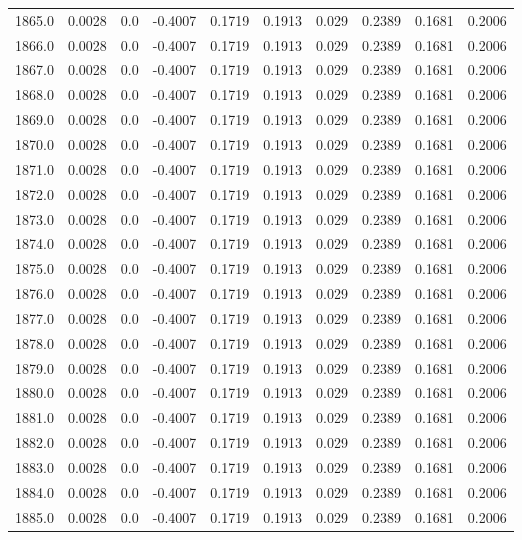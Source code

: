\begin{longtable}{lrrrrrrrrr}
1865.0 & 0.0028 & 0.0 & -0.4007 & 0.1719 & 0.1913 & 0.029 & 0.2389 & 0.1681 & 0.2006 \\
1866.0 & 0.0028 & 0.0 & -0.4007 & 0.1719 & 0.1913 & 0.029 & 0.2389 & 0.1681 & 0.2006 \\
1867.0 & 0.0028 & 0.0 & -0.4007 & 0.1719 & 0.1913 & 0.029 & 0.2389 & 0.1681 & 0.2006 \\
1868.0 & 0.0028 & 0.0 & -0.4007 & 0.1719 & 0.1913 & 0.029 & 0.2389 & 0.1681 & 0.2006 \\
1869.0 & 0.0028 & 0.0 & -0.4007 & 0.1719 & 0.1913 & 0.029 & 0.2389 & 0.1681 & 0.2006 \\
1870.0 & 0.0028 & 0.0 & -0.4007 & 0.1719 & 0.1913 & 0.029 & 0.2389 & 0.1681 & 0.2006 \\
1871.0 & 0.0028 & 0.0 & -0.4007 & 0.1719 & 0.1913 & 0.029 & 0.2389 & 0.1681 & 0.2006 \\
1872.0 & 0.0028 & 0.0 & -0.4007 & 0.1719 & 0.1913 & 0.029 & 0.2389 & 0.1681 & 0.2006 \\
1873.0 & 0.0028 & 0.0 & -0.4007 & 0.1719 & 0.1913 & 0.029 & 0.2389 & 0.1681 & 0.2006 \\
1874.0 & 0.0028 & 0.0 & -0.4007 & 0.1719 & 0.1913 & 0.029 & 0.2389 & 0.1681 & 0.2006 \\
1875.0 & 0.0028 & 0.0 & -0.4007 & 0.1719 & 0.1913 & 0.029 & 0.2389 & 0.1681 & 0.2006 \\
1876.0 & 0.0028 & 0.0 & -0.4007 & 0.1719 & 0.1913 & 0.029 & 0.2389 & 0.1681 & 0.2006 \\
1877.0 & 0.0028 & 0.0 & -0.4007 & 0.1719 & 0.1913 & 0.029 & 0.2389 & 0.1681 & 0.2006 \\
1878.0 & 0.0028 & 0.0 & -0.4007 & 0.1719 & 0.1913 & 0.029 & 0.2389 & 0.1681 & 0.2006 \\
1879.0 & 0.0028 & 0.0 & -0.4007 & 0.1719 & 0.1913 & 0.029 & 0.2389 & 0.1681 & 0.2006 \\
1880.0 & 0.0028 & 0.0 & -0.4007 & 0.1719 & 0.1913 & 0.029 & 0.2389 & 0.1681 & 0.2006 \\
1881.0 & 0.0028 & 0.0 & -0.4007 & 0.1719 & 0.1913 & 0.029 & 0.2389 & 0.1681 & 0.2006 \\
1882.0 & 0.0028 & 0.0 & -0.4007 & 0.1719 & 0.1913 & 0.029 & 0.2389 & 0.1681 & 0.2006 \\
1883.0 & 0.0028 & 0.0 & -0.4007 & 0.1719 & 0.1913 & 0.029 & 0.2389 & 0.1681 & 0.2006 \\
1884.0 & 0.0028 & 0.0 & -0.4007 & 0.1719 & 0.1913 & 0.029 & 0.2389 & 0.1681 & 0.2006 \\
1885.0 & 0.0028 & 0.0 & -0.4007 & 0.1719 & 0.1913 & 0.029 & 0.2389 & 0.1681 & 0.2006 \\

\end{longtable}
